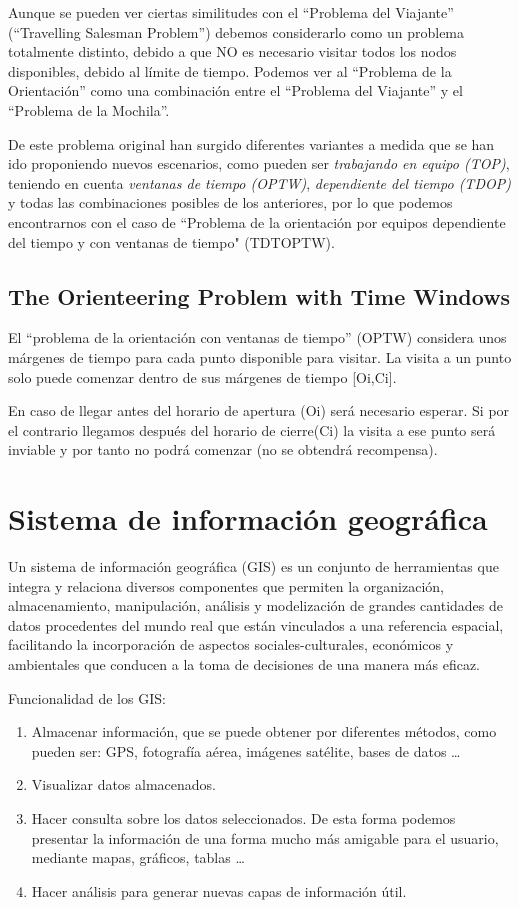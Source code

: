Aunque se pueden ver ciertas similitudes con el ``Problema del Viajante'' (``Travelling Salesman Problem'')\cite{wiki:TSP} debemos considerarlo como un problema totalmente distinto, debido a que NO es necesario visitar todos los nodos disponibles, debido al límite de tiempo.
Podemos ver al ``Problema de la Orientación'' como una combinación entre el ``Problema del Viajante'' y el ``Problema de la Mochila''\cite{wiki:KP}.

De este problema original han surgido diferentes variantes a medida que se han ido proponiendo nuevos escenarios, como pueden ser \textit{trabajando en equipo (TOP)}, teniendo en cuenta \textit{ventanas de tiempo (OPTW)}, \textit{dependiente del tiempo (TDOP)} y todas las combinaciones posibles de los anteriores, por lo que podemos encontrarnos con el caso de ``Problema de la orientación por equipos dependiente del tiempo y con ventanas de tiempo" (TDTOPTW).
\subsection{The Orienteering Problem with Time Windows}
El ``problema de la orientación con ventanas de tiempo'' (OPTW)\cite{optw} considera unos márgenes de tiempo para cada punto disponible para visitar. La visita a un punto solo puede comenzar dentro de sus márgenes de tiempo [O{i},C{i}].

En caso de llegar antes del horario de apertura (O{i}) será necesario esperar. Si por el contrario llegamos después del horario de cierre(C{i}) la visita a ese punto será inviable y por tanto no podrá comenzar (no se obtendrá recompensa).

\section{Sistema de información geográfica}
Un sistema de información geográfica (GIS) \cite{wiki:gis} es un conjunto de herramientas que integra y relaciona diversos componentes que permiten la organización, almacenamiento, manipulación, análisis y modelización de grandes cantidades de datos procedentes del mundo real que están vinculados a una referencia espacial, facilitando la incorporación de aspectos sociales-culturales, económicos y ambientales que conducen a la toma de decisiones de una manera más eficaz.

Funcionalidad de los GIS:
\begin{enumerate}
\item Almacenar información, que se puede obtener por diferentes métodos, como pueden ser: GPS, fotografía aérea, imágenes satélite, bases de datos \ldots
\item Visualizar datos almacenados.
\item Hacer consulta sobre los datos seleccionados. De esta forma podemos presentar la información de una forma mucho más amigable para el usuario, mediante mapas, gráficos, tablas \ldots
\item Hacer análisis para generar nuevas capas de información útil.
\end{enumerate}

